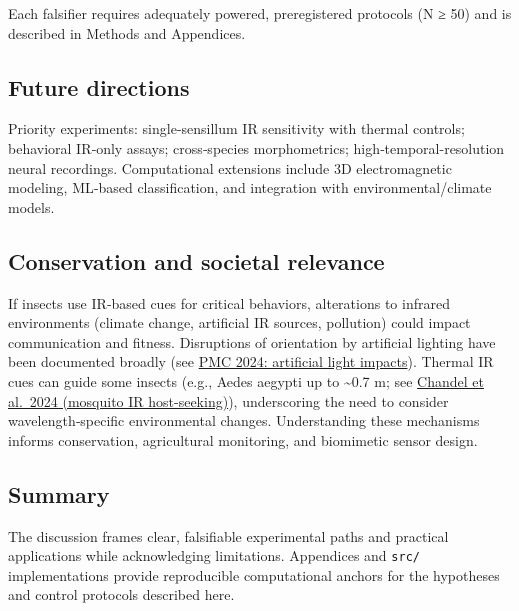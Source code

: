 \documentclass[
  13pt,
  a4paperpaper,
  12pt]{article}
\newcommand{\passthrough}[1]{#1}
\begin{document}
Each falsifier requires adequately powered, preregistered protocols (N ≥
50) and is described in Methods and Appendices.

\subsection{Future directions}\label{future-directions}

Priority experiments: single‑sensillum IR sensitivity with thermal
controls; behavioral IR‑only assays; cross‑species morphometrics;
high‑temporal-resolution neural recordings. Computational extensions
include 3D electromagnetic modeling, ML‑based classification, and
integration with environmental/climate models.

\subsection{Conservation and societal
relevance}\label{conservation-and-societal-relevance}

If insects use IR‑based cues for critical behaviors, alterations to
infrared environments (climate change, artificial IR sources, pollution)
could impact communication and fitness. Disruptions of orientation by
artificial lighting have been documented broadly (see
\href{https://pmc.ncbi.nlm.nih.gov/articles/PMC10827719/}{PMC 2024:
artificial light impacts}). Thermal IR cues can guide some insects
(e.g., Aedes aegypti up to \textasciitilde0.7 m; see
\href{https://www.nature.com/articles/s41586-024-07848-5}{Chandel et
al.~2024 (mosquito IR host-seeking)}), underscoring the need to consider
wavelength‑specific environmental changes. Understanding these
mechanisms informs conservation, agricultural monitoring, and biomimetic
sensor design.

\subsection{Summary}\label{summary}

The discussion frames clear, falsifiable experimental paths and
practical applications while acknowledging limitations. Appendices and
\passthrough{\lstinline!src/!} implementations provide reproducible
computational anchors for the hypotheses and control protocols described
here.
\end{document}
